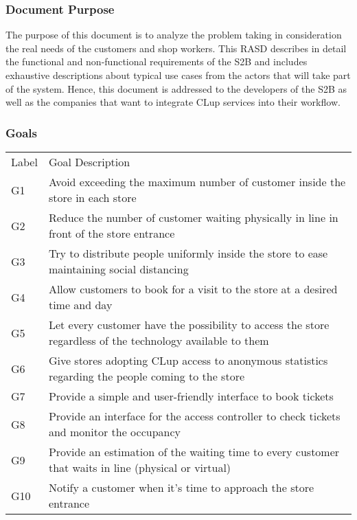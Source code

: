 \subsubsection{Document Purpose}

The purpose of this document is to analyze the problem taking in consideration the real needs of the customers and shop workers.
This RASD describes in detail the functional and non-functional requirements of the S2B and includes exhaustive descriptions about typical use cases from the actors that will take part of the system.
Hence, this document is addressed to the developers of the S2B as well as the companies that want to integrate CLup services into their workflow.

\vfill

\pagebreak

\subsubsection{Goals}
\renewcommand{\arraystretch}{1.4}
\begin{tabular}{C{1cm}L{14.1cm}}
      Label & Goal Description                                                                                           \\
      G1    & Avoid exceeding the maximum number of customer inside the store in each store                              \\
      G2    & Reduce the number of customer waiting physically in line in front of the store entrance                    \\
      G3    & Try to distribute people uniformly inside the store to ease maintaining social distancing                  \\
      G4    & Allow customers to book for a visit to the store at a desired time and day                                 \\
      G5    & Let every customer have the possibility to access the store regardless of the technology available to them \\
      G6    & Give stores adopting CLup access to anonymous statistics regarding the people coming to the store          \\
      G7    & Provide a simple and user-friendly interface to book tickets                                               \\
      G8    & Provide an interface for the access controller to check tickets and monitor the occupancy                  \\
      G9    & Provide an estimation of the waiting time to every customer that waits in line (physical or virtual)       \\
      G10   & Notify a customer when it's time to approach the store entrance                                            \\
\end{tabular}

